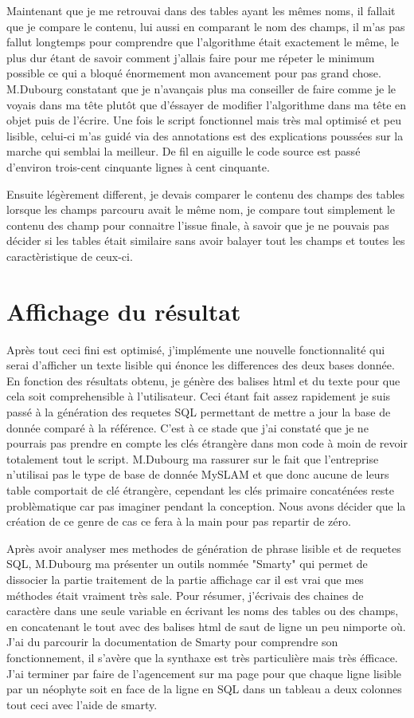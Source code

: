 Maintenant que je me retrouvai dans des tables ayant les mêmes noms, il fallait
que je compare le contenu, lui aussi en comparant le nom des champs, il m'as
pas fallut longtemps pour comprendre que l'algorithme était exactement le même,
le plus dur étant de savoir comment j'allais faire pour me répeter le minimum
possible ce qui a bloqué énormement mon avancement pour pas grand chose.
M.Dubourg constatant que je n'avançais plus ma conseiller de faire comme je le
voyais dans ma tête plutôt que d'éssayer de modifier l'algorithme dans ma tête
en objet puis de l'écrire. Une fois le script fonctionnel mais très mal
optimisé et peu lisible, celui-ci m'as guidé via des annotations est des
explications poussées sur la marche qui semblai la meilleur. De fil en aiguille
le code source est passé d'environ trois-cent cinquante lignes à cent
cinquante.

Ensuite légèrement different, je devais comparer le contenu des champs des
tables lorsque les champs parcouru avait le même nom, je compare tout
simplement le contenu des champ pour connaitre l'issue finale, à savoir que je
ne pouvais pas décider si les tables était similaire sans avoir balayer tout
les champs et toutes les caractèristique de ceux-ci.

\section{Affichage du résultat}

Après tout ceci fini est optimisé, j'implémente une nouvelle fonctionnalité qui
serai d'afficher un texte lisible qui énonce les differences des deux bases
donnée. En fonction des résultats obtenu, je génère des balises html et du
texte pour que cela soit comprehensible à l'utilisateur. Ceci étant fait assez
rapidement je suis passé à la génération des requetes SQL permettant de mettre
a jour la base de donnée comparé à la référence. C'est à ce stade que j'ai
constaté que je ne pourrais pas prendre en compte les clés étrangère dans mon
code à moin de revoir totalement tout le script.  M.Dubourg ma rassurer sur le
fait que l'entreprise n'utilisai pas le type de base de donnée MySLAM et que
donc aucune de leurs table comportait de clé étrangère, cependant les clés
primaire concaténées reste problèmatique car pas imaginer pendant la
conception. Nous avons décider que la création de ce genre de cas ce fera à la
main pour pas repartir de zéro.

Après avoir analyser mes methodes de génération de phrase lisible et de
requetes SQL, M.Dubourg ma présenter un outils nommée "Smarty" qui permet de
dissocier la partie traitement de la partie affichage car il est vrai que mes
méthodes était vraiment très sale. Pour résumer, j'écrivais des chaines de
caractère dans une seule variable en écrivant les noms des tables ou des
champs, en concatenant le tout avec des balises html de saut de ligne un peu
nimporte où. J'ai du parcourir la documentation de Smarty pour comprendre son
fonctionnement, il s'avère que la synthaxe est très particulière mais très
éfficace. J'ai terminer par faire de l'agencement sur ma page pour que chaque
ligne lisible par un néophyte soit en face de la ligne en SQL dans un tableau a
deux colonnes tout ceci avec l'aide de smarty.

\clearpage
